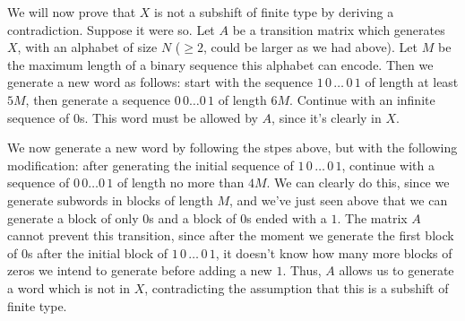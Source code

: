 \begin{problem}
\begin{enumerate}[a)]
    We will now prove that \(X\) is not a subshift of finite type by deriving a contradiction. Suppose it were so. Let \(A\) be a transition matrix which generates \(X\), with an alphabet of size \(N\) (\(\geq 2\), could be larger as we had above). Let \(M\) be the maximum length of a binary sequence this alphabet can encode. Then we generate a new word as follows: start with the sequence \(1 \, 0 \, \dots \, 0 \, 1\) of length at least \(5M\), then generate a sequence \(0 \, 0 \dots 0 \, 1\) of length \(6M\). Continue with an infinite sequence of \(0\)s. This word must be allowed by \(A\), since it's clearly in \(X\).
    
    We now generate a new word by following the stpes above, but with the following modification: after generating the initial sequence of \(1 \, 0 \, \dots \, 0 \, 1\), continue with a sequence of \(0 \, 0 \dots 0 \, 1\) of length no more than \(4M\). We can clearly do this, since we generate subwords in blocks of length \(M\), and we've just seen above that we can generate a block of only \(0\)s and a block of \(0\)s ended with a \(1\). The matrix \(A\) cannot prevent this transition, since after the moment we generate the first block of \(0\)s after the initial block of \(1 \, 0 \, \dots \, 0 \, 1\), it doesn't know how many more blocks of zeros we intend to generate before adding a new \(1\). Thus, \(A\) allows us to generate a word which is not in \(X\), contradicting the assumption that this is a subshift of finite type.
\end{enumerate}
\end{problem}

